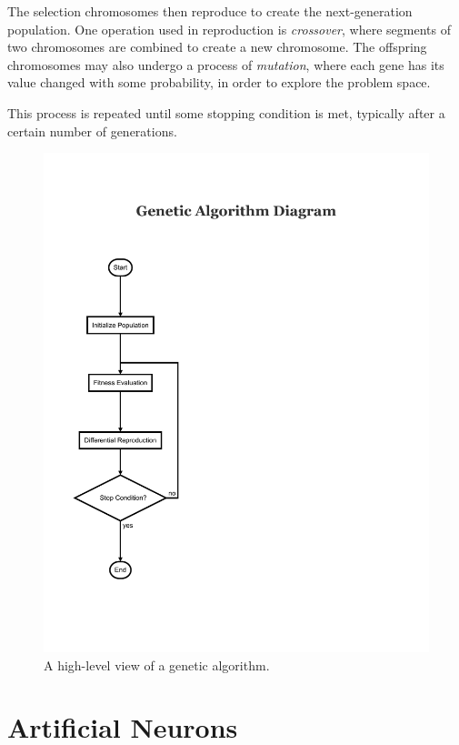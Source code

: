\documentclass[master]{outhesis}
\begin{document}
The selection chromosomes then reproduce to create the next-generation population.
One operation used in reproduction is \emph{crossover}, where segments of two chromosomes are combined to create a new chromosome.
The offspring chromosomes may also undergo a process of \emph{mutation}, where each gene has its value changed with some probability, in order to explore the problem space. 

This process is repeated until some stopping condition is met, typically after a certain number of generations.

\begin{figure}[H]
	\centering
	\includegraphics{GeneticAlgorithm.pdf}
	\caption{A high-level view of a genetic algorithm.}
\end{figure}

\section{Artificial Neurons}
\end{document}
